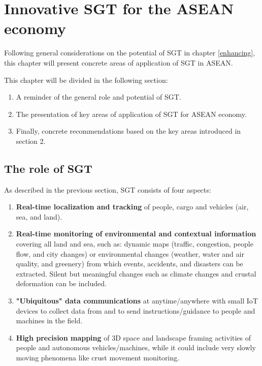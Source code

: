 \chapter{Innovative SGT for the ASEAN economy}


\tab Following general considerations on the potential of SGT in chapter \ref{enhancing}, this chapter will present concrete areas of application of SGT in ASEAN. 

\vspace{0.4 cm}

This chapter will be divided in the following section:

\begin{enumerate}

\item A reminder of the general role and potential of SGT.

\item The presentation of key areas of application of SGT for ASEAN economy.

\item Finally, concrete recommendations based on the key areas introduced in section 2.

\end{enumerate}


\section{The role of SGT}

\tab As described in the previous section, SGT consists of four aspects:

\begin{enumerate}

\item \textbf{Real-time localization and tracking} of people, cargo and vehicles (air, sea, and land).

\item \textbf{Real-time monitoring of environmental and contextual information} covering all land and sea, such as: dynamic maps (traffic, congestion, people flow, and city changes) or environmental changes (weather, water and air quality, and greenery) from which events, accidents, and disasters can be extracted. Silent but meaningful changes such as climate changes and crustal deformation can be included.

\item \textbf{"Ubiquitous" data communications} at anytime/anywhere with small IoT devices to collect data from and to send instructions/guidance to people and machines in the field.

\item \textbf{High precision mapping} of 3D space and landscape framing activities of people and  autonomous vehicles/machines, while it could include very slowly moving phenomena like crust movement monitoring.

\end{enumerate}

